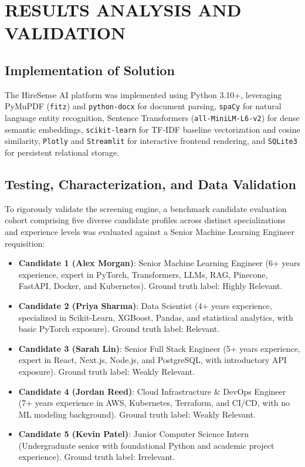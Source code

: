\documentclass[12pt,a4paper]{report}
\begin{document}
\chapter{RESULTS ANALYSIS AND VALIDATION}

\section{Implementation of Solution}
The HireSense AI platform was implemented using Python 3.10+, leveraging PyMuPDF (\texttt{fitz}) and \texttt{python-docx} for document parsing, \texttt{spaCy} for natural language entity recognition, Sentence Transformers (\texttt{all-MiniLM-L6-v2}) for dense semantic embeddings, \texttt{scikit-learn} for TF-IDF baseline vectorization and cosine similarity, \texttt{Plotly} and \texttt{Streamlit} for interactive frontend rendering, and \texttt{SQLite3} for persistent relational storage.

\section{Testing, Characterization, and Data Validation}
To rigorously validate the screening engine, a benchmark candidate evaluation cohort comprising five diverse candidate profiles across distinct specializations and experience levels was evaluated against a Senior Machine Learning Engineer requisition:
\begin{itemize}
    \item \textbf{Candidate 1 (Alex Morgan)}: Senior Machine Learning Engineer (6+ years experience, expert in PyTorch, Transformers, LLMs, RAG, Pinecone, FastAPI, Docker, and Kubernetes). Ground truth label: Highly Relevant.
    \item \textbf{Candidate 2 (Priya Sharma)}: Data Scientist (4+ years experience, specialized in Scikit-Learn, XGBoost, Pandas, and statistical analytics, with basic PyTorch exposure). Ground truth label: Relevant.
    \item \textbf{Candidate 3 (Sarah Lin)}: Senior Full Stack Engineer (5+ years experience, expert in React, Next.js, Node.js, and PostgreSQL, with introductory API exposure). Ground truth label: Weakly Relevant.
    \item \textbf{Candidate 4 (Jordan Reed)}: Cloud Infrastructure \& DevOps Engineer (7+ years experience in AWS, Kubernetes, Terraform, and CI/CD, with no ML modeling background). Ground truth label: Weakly Relevant.
    \item \textbf{Candidate 5 (Kevin Patel)}: Junior Computer Science Intern (Undergraduate senior with foundational Python and academic project experience). Ground truth label: Irrelevant.
\end{itemize}
\end{document}
